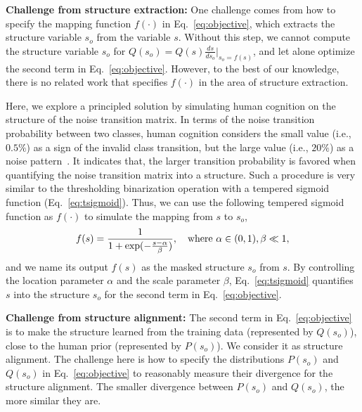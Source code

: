 \documentclass{article}
\begin{document}
\textbf{Challenge from structure extraction:} One challenge comes from how to specify the mapping function $f(\cdot)$ in Eq.~\eqref{eq:objective}, which extracts the structure variable $s_o$ from the variable $s$. Without this step, we cannot compute the structure variable $s_o$ for $Q(s_o) = Q(s)\frac{ds}{ds_o}\big|_{s_o=f(s)}$, and let alone optimize the second term in Eq.~\eqref{eq:objective}. However, to the best of our knowledge, there is no related work that specifies $f(\cdot)$ in the area of structure extraction.


Here, we explore a principled solution by simulating human cognition on the structure of the noise transition matrix. In terms of the noise transition probability between two classes, human cognition considers the small value (i.e., $0.5\%$) as a sign of the invalid class transition, but the large value (i.e., $20\%$) as a noise pattern~\cite{grigolini2009theory}. It indicates that, the larger transition probability is favored when quantifying the noise transition matrix into a structure. Such a procedure is very similar to the thresholding binarization operation with a tempered sigmoid function (Eq.~\eqref{eq:tsigmoid}). Thus, we can use the following tempered sigmoid function as $f(\cdot)$ to simulate the mapping from $s$ to $s_o$,
\begin{align}\label{eq:tsigmoid}
f(s) = \frac{1}{1+\exp(-\frac{s-\alpha}{\beta})}, \text{\quad where $\alpha\in(0,1),\beta \ll 1$},
\end{align}
and we name its output $f(s)$ as the masked structure $s_o$ from $s$. By controlling the location parameter $\alpha$ and the scale parameter $\beta$, Eq.~\eqref{eq:tsigmoid} quantifies $s$ into the structure $s_o$ for the second term in Eq.~\eqref{eq:objective}.

\textbf{Challenge from structure alignment:} The second term in Eq.~\eqref{eq:objective} is to make the structure learned from the training data (represented by $Q(s_o)$), close to the human prior (represented by $P(s_o)$). We consider it as structure alignment. The challenge here is how to specify the distributions $P(s_o)$ and $Q(s_o)$ in Eq.~\eqref{eq:objective} to reasonably measure their divergence for the structure alignment. The smaller divergence between $P(s_o)$ and $Q(s_o)$, the more similar they are.
\end{document}
